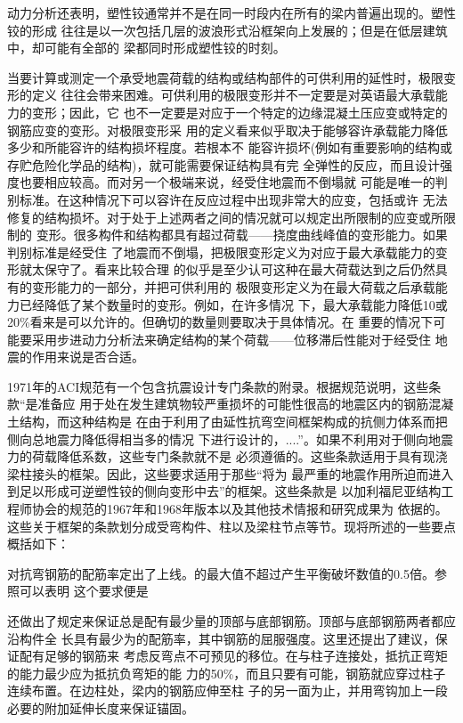 \documentclass[12pt,a4paper]{book}
\begin{document}
动力分析还表明，塑性铰通常并不是在同一时段内在所有的梁内普遍出现的。塑性铰的形成
往往是以一次包括几层的波浪形式沿框架向上发展的；但是在低层建筑中，却可能有全部的
梁都同时形成塑性铰的时刻。

当要计算或测定一个承受地震荷载的结构或结构部件的可供利用的延性时，极限变形的定义
往往会带来困难。可供利用的极限变形并不一定要是对英语最大承载能力的变形；因此，它
也不一定要是对应于一个特定的边缘混凝土压应变或特定的钢筋应变的变形。对极限变形采
用的定义看来似乎取决于能够容许承载能力降低多少和所能容许的结构损坏程度。若根本不
能容许损坏(例如有重要影响的结构或存贮危险化学品的结构)，就可能需要保证结构具有完
全弹性的反应，而且设计强度也要相应较高。而对另一个极端来说，经受住地震而不倒塌就
可能是唯一的判别标准。在这种情况下可以容许在反应过程中出现非常大的应变，包括或许
无法修复的结构损坏。对于处于上述两者之间的情况就可以规定出所限制的应变或所限制的
变形。很多构件和结构都具有超过荷载——挠度曲线峰值的变形能力。如果判别标准是经受住
了地震而不倒塌，把极限变形定义为对应于最大承载能力的变形就太保守了。看来比较合理
的似乎是至少认可这种在最大荷载达到之后仍然具有的变形能力的一部分，并把可供利用的
极限变形定义为在最大荷载之后承载能力已经降低了某个数量时的变形。例如，在许多情况
下，最大承载能力降低10或20\%看来是可以允许的。但确切的数量则要取决于具体情况。在
重要的情况下可能要采用步进动力分析法来确定结构的某个荷载——位移滞后性能对于经受住
地震的作用来说是否合适。

1971年的ACI规范有一个包含抗震设计专门条款的附录。根据规范说明，这些条款“是准备应
用于处在发生建筑物较严重损坏的可能性很高的地震区内的钢筋混凝土结构，而这种结构是
在由于利用了由延性抗弯空间框架构成的抗侧力体系而把侧向总地震力降低得相当多的情况
下进行设计的，....”。如果不利用对于侧向地震力的荷载降低系数，这些专门条款就不是
必须遵循的。这些条款适用于具有现浇梁柱接头的框架。因此，这些要求适用于那些“将为
最严重的地震作用所迫而进入到足以形成可逆塑性铰的侧向变形中去”的框架。这些条款是
以加利福尼亚结构工程师协会的规范的1967年和1968年版本以及其他技术情报和研究成果为
依据的。这些关于框架的条款划分成受弯构件、柱以及梁柱节点等节。现将所述的一些要点
概括如下：

对抗弯钢筋的配筋率定出了上线。的最大值不超过产生平衡破坏数值的0.5倍。参照可以表明
这个要求便是

还做出了规定来保证总是配有最少量的顶部与底部钢筋。顶部与底部钢筋两者都应沿构件全
长具有最少为的配筋率，其中钢筋的屈服强度。这里还提出了建议，保证配有足够的钢筋来
考虑反弯点不可预见的移位。在与柱子连接处，抵抗正弯矩的能力最少应为抵抗负弯矩的能
力的50\%，而且只要有可能，钢筋就应穿过柱子连续布置。在边柱处，梁内的钢筋应伸至柱
子的另一面为止，并用弯钩加上一段必要的附加延伸长度来保证锚固。
\end{document}
